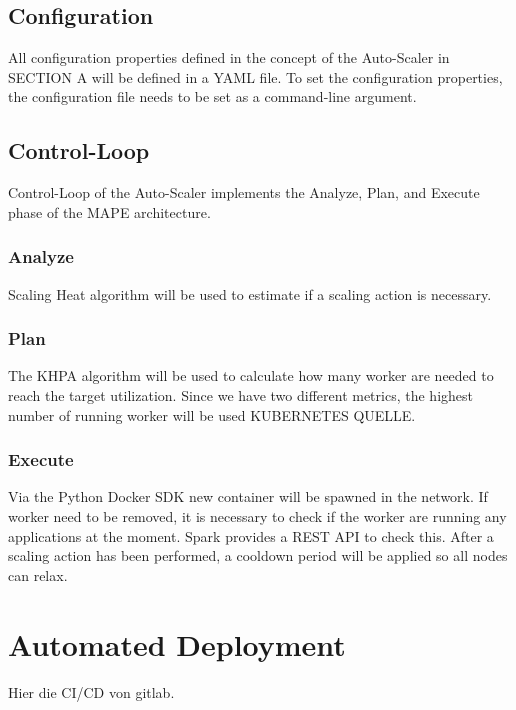 \subsection{Configuration}
All configuration properties defined in the concept of the Auto-Scaler in SECTION A will be defined in a YAML file.
To set the configuration properties, the configuration file needs to be set as a command-line argument.

\subsection{Control-Loop}
Control-Loop of the Auto-Scaler implements the Analyze, Plan, and Execute phase of the MAPE architecture.

\subsubsection{Analyze}
Scaling Heat algorithm will be used to estimate if a scaling action is necessary.

\subsubsection{Plan}
The KHPA algorithm will be used to calculate how many worker are needed to reach the target utilization. Since we have two different metrics, the highest number of running worker will be used KUBERNETES QUELLE.

\subsubsection{Execute}
Via the Python Docker SDK new container will be spawned in the network.
If worker need to be removed, it is necessary to check if the worker are running any applications at the moment. Spark provides a REST API to check this.
After a scaling action has been performed, a cooldown period will be applied so all nodes can relax.



\section{Automated Deployment}
Hier die CI/CD von gitlab.
